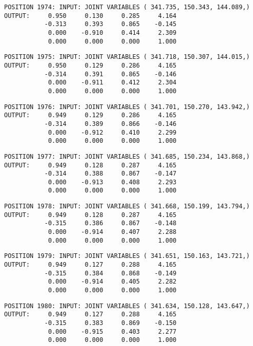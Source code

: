 \begin{verbatim}
POSITION 1974: INPUT: JOINT VARIABLES ( 341.735, 150.343, 144.089,)
OUTPUT:     0.950     0.130     0.285     4.164
           -0.313     0.393     0.865    -0.145
            0.000    -0.910     0.414     2.309
            0.000     0.000     0.000     1.000
\end{verbatim} \pagebreak[1]\begin{verbatim}
POSITION 1975: INPUT: JOINT VARIABLES ( 341.718, 150.307, 144.015,)
OUTPUT:     0.950     0.129     0.286     4.165
           -0.314     0.391     0.865    -0.146
            0.000    -0.911     0.412     2.304
            0.000     0.000     0.000     1.000
\end{verbatim} \pagebreak[1]\begin{verbatim}
POSITION 1976: INPUT: JOINT VARIABLES ( 341.701, 150.270, 143.942,)
OUTPUT:     0.949     0.129     0.286     4.165
           -0.314     0.389     0.866    -0.146
            0.000    -0.912     0.410     2.299
            0.000     0.000     0.000     1.000
\end{verbatim} \pagebreak[1]\begin{verbatim}
POSITION 1977: INPUT: JOINT VARIABLES ( 341.685, 150.234, 143.868,)
OUTPUT:     0.949     0.128     0.287     4.165
           -0.314     0.388     0.867    -0.147
            0.000    -0.913     0.408     2.293
            0.000     0.000     0.000     1.000
\end{verbatim} \pagebreak[1]\begin{verbatim}
POSITION 1978: INPUT: JOINT VARIABLES ( 341.668, 150.199, 143.794,)
OUTPUT:     0.949     0.128     0.287     4.165
           -0.315     0.386     0.867    -0.148
            0.000    -0.914     0.407     2.288
            0.000     0.000     0.000     1.000
\end{verbatim} \pagebreak[1]\begin{verbatim}
POSITION 1979: INPUT: JOINT VARIABLES ( 341.651, 150.163, 143.721,)
OUTPUT:     0.949     0.127     0.288     4.165
           -0.315     0.384     0.868    -0.149
            0.000    -0.914     0.405     2.282
            0.000     0.000     0.000     1.000
\end{verbatim} \pagebreak[1]\begin{verbatim}
POSITION 1980: INPUT: JOINT VARIABLES ( 341.634, 150.128, 143.647,)
OUTPUT:     0.949     0.127     0.288     4.165
           -0.315     0.383     0.869    -0.150
            0.000    -0.915     0.403     2.277
            0.000     0.000     0.000     1.000
\end{verbatim} \pagebreak[1]\begin{verbatim}

\end{verbatim}
